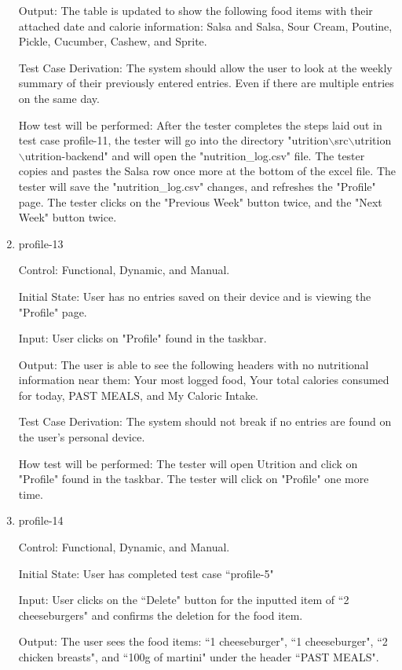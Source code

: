 \documentclass[12pt, titlepage]{article}
\begin{document}
\begin{enumerate}
		Output: The table is updated to show the following food items with their attached date and calorie information: Salsa and Salsa, Sour Cream, Poutine, Pickle, Cucumber, Cashew, and Sprite.
		
		Test Case Derivation: The system should allow the user to look at the weekly summary of their previously entered entries. Even if there are multiple entries on the same day.
		
		How test will be performed: After the tester completes the steps laid out in test case profile-11, the tester will go into the directory "utrition$\backslash$src$\backslash$utrition$\backslash$utrition-backend" and will open the "nutrition\_log.csv" file. The tester copies and pastes the Salsa row once more at the bottom of the excel file. The tester will save the "nutrition\_log.csv" changes, and refreshes the "Profile" page. The tester clicks on the "Previous Week" button twice, and the "Next Week" button twice.
		
		\item{profile-13\\}
		
		Control: Functional, Dynamic, and Manual.
		
		Initial State: User has no entries saved on their device and is viewing the "Profile" page.
		
		Input: User clicks on "Profile" found in the taskbar.
		
		Output: The user is able to see the following headers with no nutritional information near them: Your most logged food, Your total calories consumed for today, PAST MEALS, and My Caloric Intake.
		
		Test Case Derivation: The system should not break if no entries are found on the user's personal device.
		
		How test will be performed: The tester will open Utrition and click on "Profile" found in the taskbar. The tester will click on "Profile" one more time.
		
		\item{profile-14\\}
		
		Control: Functional, Dynamic, and Manual.
		
		Initial State: User has completed test case ``profile-5"
		
		Input: User clicks on the ``Delete" button for the inputted item of ``2 cheeseburgers" and confirms the deletion for the food item.
		
		Output: The user sees the food items: ``1 cheeseburger", ``1 cheeseburger", ``2 chicken breasts", and ``100g of martini" under the header ``PAST MEALS".
		

\end{enumerate}
\end{document}
